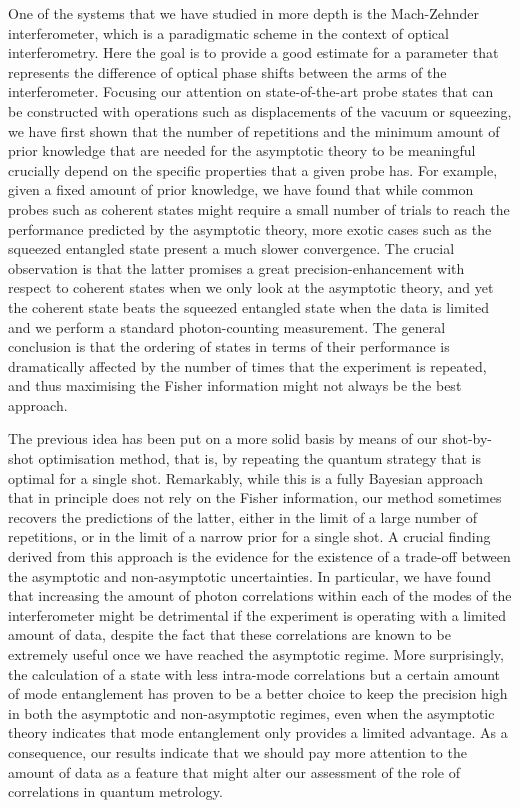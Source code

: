 One of the systems that we have studied in more depth is the Mach-Zehnder interferometer, which is a paradigmatic scheme in the context of optical interferometry. Here the goal is to provide a good estimate for a parameter that represents the difference of optical phase shifts between the arms of the interferometer. Focusing our attention on state-of-the-art probe states that can be constructed with operations such as displacements of the vacuum or squeezing, we have first shown that the number of repetitions and the minimum amount of prior knowledge that are needed for the asymptotic theory to be meaningful crucially depend on the specific properties that a given probe has. For example, given a fixed amount of prior knowledge, we have found that while common probes such as coherent states might require a small number of  trials to reach the performance predicted by the asymptotic theory, more exotic cases such as the squeezed entangled state present a much slower convergence. The crucial observation is that the latter promises a great precision-enhancement with respect to coherent states when we only look at the asymptotic theory, and yet the coherent state beats the squeezed entangled state when the data is limited and we perform a standard photon-counting measurement. The general conclusion is that the ordering of states in terms of their performance is dramatically affected by the number of times that the experiment is repeated, and thus maximising the Fisher information might not always be the best approach. 

The previous idea has been put on a more solid basis by means of our shot-by-shot optimisation method, that is, by repeating the quantum strategy that is optimal for a single shot. Remarkably, while this is a fully Bayesian approach that in principle does not rely on the Fisher information, our method sometimes recovers the predictions of the latter, either in the limit of a large number of repetitions, or in the limit of a narrow prior for a single shot. A crucial finding derived from this approach is the evidence for the existence of a trade-off between the asymptotic and non-asymptotic uncertainties. In particular, we have found that increasing the amount of photon correlations within each of the modes of the interferometer might be detrimental if the experiment is operating with a limited amount of data, despite the fact that these correlations are known to be extremely useful once we have reached the asymptotic regime. More surprisingly, the calculation of a state with less intra-mode correlations but a certain amount of mode entanglement has proven to be a better choice to keep the precision high in both the asymptotic and non-asymptotic regimes, even when the asymptotic theory indicates that mode entanglement only provides a limited advantage. As a consequence, our results indicate that we should pay more attention to the amount of data as a feature that might alter our assessment of the role of correlations in quantum metrology. 

